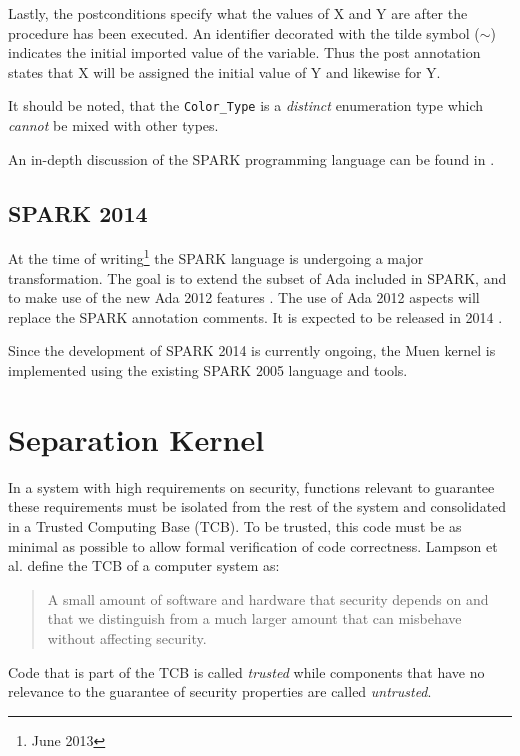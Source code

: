 Lastly, the postconditions specify what the values of X and Y are after the
procedure has been executed. An identifier decorated with the tilde symbol
($\sim$) indicates the initial imported value of the variable. Thus the post
annotation states that X will be assigned the initial value of Y and likewise
for Y.

It should be noted, that the \texttt{Color\_Type} is a \emph{distinct}
enumeration type which \emph{cannot} be mixed with other types.

An in-depth discussion of the SPARK programming language can be found in
\cite{BarnesSPARK}.

\subsection{SPARK 2014}
At the time of writing\footnote{June 2013} the SPARK language is undergoing a
major transformation. The goal is to extend the subset of Ada included in SPARK,
and to make use of the new Ada 2012 features \cite{Ada2012}. The use of Ada 2012
aspects will replace the SPARK annotation comments. It is expected to be
released in 2014 \cite{SPARK2014:Announcement}.

Since the development of SPARK 2014 is currently ongoing, the Muen kernel is
implemented using the existing SPARK 2005 language and tools.




\section{Separation Kernel}
In a system with high requirements on security, functions relevant
to guarantee these requirements must be isolated from the rest of
the system and consolidated in a Trusted Computing Base (TCB).
To be trusted, this code must be as minimal as possible to allow formal
verification of code correctness. Lampson et al.
\cite{Lampson:1991:ADS:121133.121160} define the TCB of a computer system as:
\begin{quote}
	A small amount of software and hardware that security depends on and
	that we distinguish from a much larger amount that can misbehave without
	affecting security.
\end{quote}

Code that is part of the TCB is called \emph{trusted} while components that have
no relevance to the guarantee of security properties are called
\emph{untrusted}.

